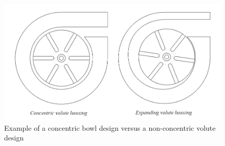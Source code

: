 \documentclass[11pt,twoside,a4paper,openright]{report}
\begin{document}
\vspace{12pt}
\begin{figure}[h]
\includegraphics[width=\textwidth]{concentric_vs_volute.png}
\caption{Example of a concentric bowl design versus a non-concentric volute design}
\end{figure}
\end{document}
